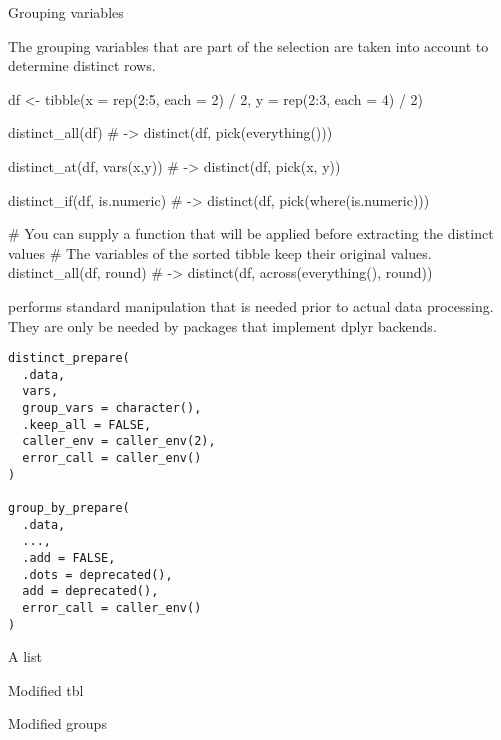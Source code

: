 \documentclass[a4paper]{book}
\begin{document}
%
\begin{Section}{Grouping variables}


The grouping variables that are part of the selection are taken
into account to determine distinct rows.
\end{Section}
%
\begin{Examples}
\begin{ExampleCode}
df <- tibble(x = rep(2:5, each = 2) / 2, y = rep(2:3, each = 4) / 2)

distinct_all(df)
# ->
distinct(df, pick(everything()))

distinct_at(df, vars(x,y))
# ->
distinct(df, pick(x, y))

distinct_if(df, is.numeric)
# ->
distinct(df, pick(where(is.numeric)))

# You can supply a function that will be applied before extracting the distinct values
# The variables of the sorted tibble keep their original values.
distinct_all(df, round)
# ->
distinct(df, across(everything(), round))
\end{ExampleCode}
\end{Examples}
%
\begin{Description}
 performs standard manipulation that is needed prior
to actual data processing. They are only be needed by packages
that implement dplyr backends.
\end{Description}
%
\begin{Usage}
\begin{verbatim}
distinct_prepare(
  .data,
  vars,
  group_vars = character(),
  .keep_all = FALSE,
  caller_env = caller_env(2),
  error_call = caller_env()
)

group_by_prepare(
  .data,
  ...,
  .add = FALSE,
  .dots = deprecated(),
  add = deprecated(),
  error_call = caller_env()
)
\end{verbatim}
\end{Usage}
%
\begin{Value}
A list
\begin{ldescription}
\item[\code{data}] Modified tbl
\item[\code{groups}] Modified groups
\end{ldescription}
\end{Value}
\end{document}
